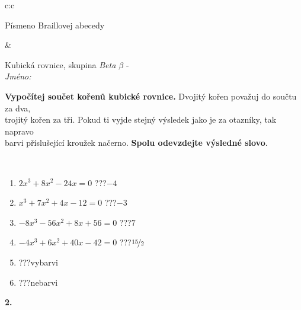 \documentclass[10pt]{report}
\begin{document}
\begin{tabular}{c:c}
\begin{minipage}[c][104.5mm][t]{0.5\linewidth}
\begin{center}
\begin{minipage}{0.20\linewidth}
\begin{center}
{\small Písmeno Braillovej abecedy}
\end{center}
\end{minipage}
\end{center}
\end{minipage}
&
\begin{minipage}[c][104.5mm][t]{0.5\linewidth}
\begin{center}
\vspace{7mm}
{\huge Kubická rovnice, skupina \textit{Beta $\beta$} -}\\[5mm]
\textit{Jméno:}\phantom{xxxxxxxxxxxxxxxxxxxxxxxxxxxxxxxxxxxxxxxxxxxxxxxxxxxxxxxxxxxxxxxxx}\\[5mm]
\begin{minipage}{0.95\linewidth}
\begin{center}
\textbf{Vypočítej součet kořenů kubické rovnice.} Dvojitý kořen považuj do součtu za dva,\\trojitý kořen za tři. Pokud ti vyjde stejný výsledek jako je za otazníky, tak napravo\\barvi příslušející kroužek načerno. \textbf{Spolu odevzdejte výsledné slovo}.
\end{center}
\end{minipage}
\\[1mm]
\begin{minipage}{0.79\linewidth}
\begin{center}
\begin{varwidth}{\linewidth}
\begin{enumerate}
\Large
\item $2x^3+8x^2-24x=0$\quad \dotfill\; ???\;\dotfill \quad $-4$
\item $x^3+7x^2+4x-12=0$\quad \dotfill\; ???\;\dotfill \quad $-3$
\item $-8x^3-56x^2+8x+56=0$\quad \dotfill\; ???\;\dotfill \quad $7$
\item $-4x^3+6x^2+40x-42=0$\quad \dotfill\; ???\;\dotfill \quad $\nicefrac{15}{2}$
\item \quad \dotfill\; ???\;\dotfill \quad vybarvi
\item \quad \dotfill\; ???\;\dotfill \quad nebarvi
\end{enumerate}
\end{varwidth}
\end{center}
\end{minipage}
\begin{minipage}{0.20\linewidth}
\begin{center}
{\Huge\bfseries 2.} \\[2mm]

\end{center}
\end{minipage}
\end{center}
\end{minipage}
\end{tabular}
\end{document}
